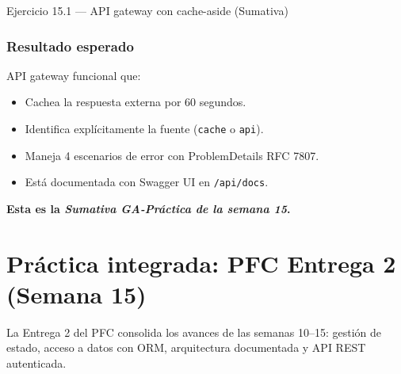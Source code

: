 \documentclass[11pt,a4paper,openany]{book}
\begin{document}
\begin{cajaejercicio}{Ejercicio 15.1 --- API gateway con cache-aside (Sumativa)}
\subsubsection*{Resultado esperado}

API gateway funcional que:
\begin{itemize}
\item Cachea la respuesta externa por 60 segundos.
\item Identifica explícitamente la fuente (\texttt{cache} o
\texttt{api}).
\item Maneja 4 escenarios de error con ProblemDetails RFC 7807.
\item Está documentada con Swagger UI en \texttt{/api/docs}.
\end{itemize}

\textbf{Esta es la \emph{Sumativa GA-Práctica de la semana 15}.}
\end{cajaejercicio}

\section{Práctica integrada: PFC Entrega 2 (Semana 15)}

La Entrega 2 del PFC consolida los avances de las semanas
10--15: gestión de estado, acceso a datos con ORM, arquitectura
documentada y API REST autenticada.
\end{document}
